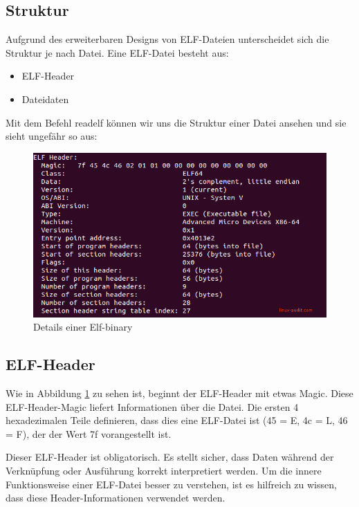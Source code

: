 \subsection{Struktur}
Aufgrund des erweiterbaren Designs von ELF-Dateien unterscheidet sich die Struktur je nach Datei. Eine ELF-Datei besteht aus:

\begin{itemize} 
\item ELF-Header
\item Dateidaten
\end{itemize}

Mit dem Befehl readelf können wir uns die Struktur einer Datei ansehen und sie sieht ungefähr so aus:

\begin{figure}[H]
    \begin{center}
        \includegraphics[scale=0.5]{images/elf-header-linux-binary.png}
        \caption{Details einer Elf-binary \cite{details_of_Elf_binary}}
        \label{abb:details-elf}
    \end{center}
\end{figure}

\subsection{ELF-Header}
Wie in Abbildung \ref{abb:details-elf} zu sehen ist, beginnt der ELF-Header mit etwas Magic. Diese ELF-Header-Magic liefert Informationen über die Datei. Die ersten 4 hexadezimalen Teile definieren, dass dies eine ELF-Datei ist (45 = E, 4c = L, 46 = F), der der Wert 7f vorangestellt ist.
 
Dieser ELF-Header ist obligatorisch. Es stellt sicher, dass Daten während der Verknüpfung oder Ausführung korrekt interpretiert werden. Um die innere Funktionsweise einer ELF-Datei besser zu verstehen, ist es hilfreich zu wissen, dass diese Header-Informationen verwendet werden.
 

